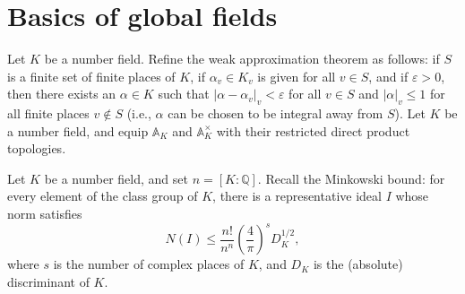 \documentclass[11pt,answers,addpoints,reqno]{exam}
\theoremstyle{definition}
\theoremstyle{remark}
\theoremstyle{definition}
\theoremstyle{remark}
\theoremstyle{remark}
\newcommand{\Q}{\mathbb{Q}}
\newcommand{\adele}{\mathbb{A}}
\newcommand{\idele}{\mathbb{A}^\times}
\begin{document}
\section{Basics of global fields}
\begin{questions}
\question Let $K$ be a number field. Refine the weak approximation theorem as follows: if $S$ is a finite set of finite places of $K$, if $\alpha_v \in K_v$ is given for all $v \in S$, and if $\varepsilon > 0$, then there exists an $\alpha \in K$ such that $|\alpha-\alpha_v|_v < \varepsilon$ for all $v \in S$ and $|\alpha|_v \leq 1$ for all finite places $v \not \in S$ (i.e., $\alpha$ can be chosen to be integral away from $S$).
\question Let $K$ be a number field, and equip $\adele_K$ and $\idele_K$ with their restricted direct product topologies.
\question Let $K$ be a number field, and set $n= [K:\Q]$. Recall the Minkowski
bound: for every element of the class group of $K$, there is a representative ideal $I$ whose norm satisfies
\[
N(I) \leq \frac{n!}{n^n} \left( \frac{4}{\pi} \right)^s D_K^{1/2},
\]
where $s$ is the number of complex places of $K$, and $D_K$ is the (absolute) discriminant of $K$. 
\begin{parts}

\end{parts}
\end{questions}
\end{document}
